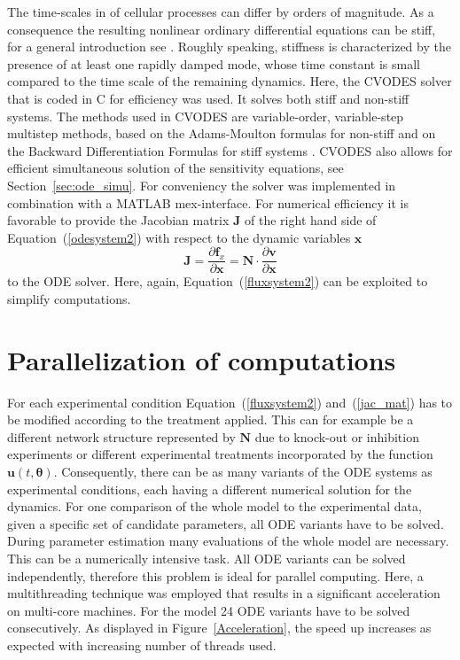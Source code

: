 \documentclass[12pt,a4paper]{scrartcl}
\newcommand{\dd}[2]{\frac{\partial #1}{\partial #2}}
\begin{document}
The time-scales in of cellular processes can differ by orders of magnitude. As a consequence the resulting nonlinear ordinary differential equations can be stiff, for a general introduction see \citet{Lambert:1977fk}. Roughly speaking, stiffness is characterized by the presence of at least one rapidly damped mode, whose time constant is small compared to the time scale of the remaining dynamics. Here, the CVODES solver \citep{Hindmarsh:2005fb} that is coded in C for efficiency was used. It solves both stiff and non-stiff systems. The methods used in CVODES are variable-order, variable-step multistep methods, based on the Adams-Moulton formulas for non-stiff and on the Backward Differentiation Formulas for stiff systems \citep{Byrne:1975uq}. CVODES also allows for efficient simultaneous solution of the sensitivity equations, see Section~\ref{sec:ode_simu}. For conveniency the solver was implemented in combination with a MATLAB mex-interface. For numerical efficiency it is favorable to provide the Jacobian matrix $\mathbf{J}$ of the right hand side of Equation~(\ref{odesystem2}) with respect to the dynamic variables $\mathbf{x}$ 
\begin{equation}
	\mathbf{J} = \dd{\mathbf{f}_{x}}{\mathbf{x}} = \mathbf{N} \cdot \dd{\mathbf{v}}{\mathbf{x}}\label{jac_mat}
\end{equation}
to the ODE solver. Here, again, Equation~(\ref{fluxsystem2}) can be exploited to simplify computations.

\section{Parallelization of computations} \label{sec:parallel}
For each experimental condition Equation~(\ref{fluxsystem2}) and~(\ref{jac_mat}) has to be modified according to the treatment applied. This can for example be a different network structure represented by $\mathbf{N}$ due to knock-out or inhibition experiments or different experimental treatments incorporated by the function $\mathbf{u}(t, \boldsymbol{\theta})$. Consequently, there can be as many variants of the ODE systems as experimental conditions, each having a different numerical solution for the dynamics. For one comparison of the whole model to the experimental data, given a specific set of candidate parameters, all ODE variants have to be solved. During parameter estimation many evaluations of the whole model are necessary. This can be a numerically intensive task. All ODE variants can be solved independently, therefore this problem is ideal for parallel computing. Here, a multithreading technique was employed that results in a significant acceleration on multi-core machines. For the \citet{Bachmann:2011fk} model 24 ODE variants have to be solved consecutively. As displayed in Figure~\ref{Acceleration}, the speed up increases as expected with increasing number of threads used.
\end{document}
